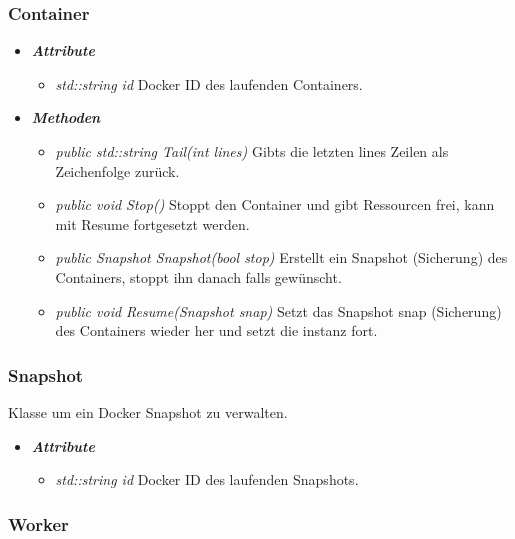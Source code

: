 \documentclass[a4paper,12pt]{article}
\begin{document}
\subsubsection{Container}

\begin{itemize}[label={}]
	\item \textit{\textbf{Attribute}}
		\begin{itemize}[label={\textbullet}]
			\item \textit{std::string id} Docker ID des laufenden Containers.
		\end{itemize}

	\item\textit{\textbf{Methoden}}
		\begin{itemize}[label={\textbullet}]
			\item\textit{public std::string Tail(int lines)} Gibts die letzten lines Zeilen als Zeichenfolge zurück.
			\item\textit{public void Stop()} Stoppt den Container und gibt Ressourcen frei, kann mit Resume fortgesetzt werden.
			\item\textit{public Snapshot Snapshot(bool stop)} Erstellt ein Snapshot (Sicherung) des Containers, stoppt ihn danach falls gewünscht.
			\item\textit{public void Resume(Snapshot snap)} Setzt das Snapshot snap (Sicherung) des Containers wieder her und setzt die instanz fort.
			
		\end{itemize}

\end{itemize}

\subsubsection{Snapshot}

Klasse um ein Docker Snapshot zu verwalten.

\begin{itemize}[label={}]
	\item \textit{\textbf{Attribute}}
		\begin{itemize}[label={\textbullet}]
			\item \textit{std::string id} Docker ID des laufenden Snapshots.
		\end{itemize}

\end{itemize}

\subsubsection{Worker}
\end{document}
